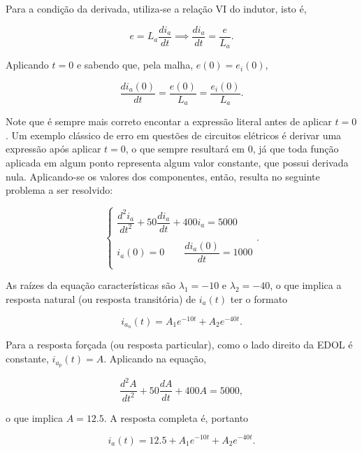 \documentclass{article}
\numberwithin{equation}{section}
\let\dfr\dfrac
\begin{document}
\noindent Para a condição da derivada, utiliza-se a relação VI do indutor, isto é,

\begin{equation*}
    e = L_a \dfr{di_a}{dt} \implies \dfr{di_a}{dt} = \dfr{e}{L_a}.
\end{equation*}

\noindent Aplicando $t=0$ e sabendo que, pela malha, $e(0)=e_i(0)$,

\begin{equation*}
    \dfr{di_a(0)}{dt} = \dfr{e(0)}{L_a} = \dfr{e_i(0)}{L_a}.
\end{equation*}

\noindent Note que é sempre mais correto encontar a expressão literal antes de aplicar $t=0$. Um exemplo clássico de erro em questões de circuitos elétricos é derivar uma expressão após aplicar $t=0$, o que sempre resultará em $0$, já que toda função aplicada em algum ponto representa algum valor constante, que possui derivada nula. Aplicando-se os valores dos componentes, então, resulta no seguinte problema a ser resolvido:

\begin{equation*}
    \begin{cases}
        \dfr{d^2i_a}{dt^2} + 50 \dfr{di_a}{dt} + 400i_a = 5000
        \\ \\
        i_a(0) = 0 \qquad \dfr{di_a(0)}{dt} = 1000
        \\
    \end{cases}
    .
\end{equation*}

\noindent As raízes da equação características são $\lambda_1=-10$ e $\lambda_2=-40$, o que implica a resposta natural (ou resposta transitória) de $i_a(t)$ ter o formato

\begin{equation*}
    i_{a_n}(t) = A_1e^{-10t} + A_2e^{-40t}.
\end{equation*}

\noindent Para a resposta forçada (ou resposta particular), como o lado direito da EDOL é constante, $i_{a_p}(t) = A$. Aplicando na equação,

\begin{equation*}
    \dfr{d^2A}{dt^2} + 50 \dfr{dA}{dt} + 400A = 5000,
\end{equation*}

\noindent o que implica $A = 12.5$. A resposta completa é, portanto

\begin{equation*}
    i_a(t) = 12.5 + A_1e^{-10t} + A_2e^{-40t}.
\end{equation*}
\end{document}
